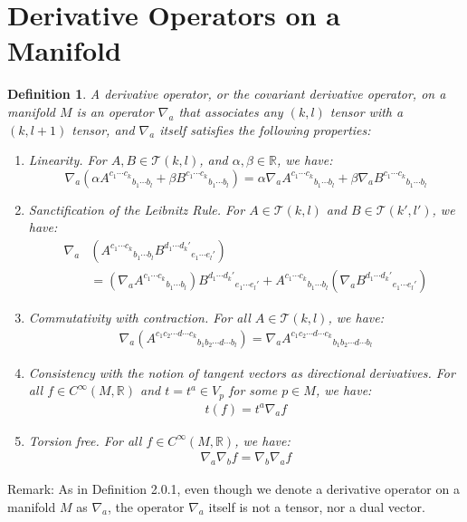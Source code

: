 \documentclass[11pt, onesided]{book}
\theoremstyle{break}
\theoremstyle{break}
\newtheorem{defn}{Definition}[thm]
\newcommand{\R}{\mathbb{R}}
\newcommand{\remark}{\color{blue}Remark: \color{black}}
\begin{document}
\section[Derivative Operators on a Manifold]{\color{red} Derivative Operators on a Manifold\color{black}}
\begin{defn}
A derivative operator, or the covariant derivative operator, on a manifold $M$ is an operator $\nabla_a$ that associates any $(k, l)$ tensor with a $(k, l+1)$ tensor, and $\nabla_a$ itself satisfies the following properties:
\begin{enumerate}
\item Linearity. For $A,B \in \mathcal{T}(k, l)$, and $\alpha,\beta \in \R$, we have: 
$$\nabla_a(\alpha A^{c_1 \cdots  c_k}{}_{b_1 \cdots b_l} + \beta B^{c_1\cdots  c_k}{}_{b_1 \cdots b_l}) = \alpha \nabla_a A^{c_1 \cdots  c_k}{}_{b_1 \cdots b_l} + \beta \nabla_a B^{c_1 \cdots  c_k}{}_{b_1 \cdots b_l}$$
\item Sanctification of the Leibnitz Rule. For $A\in \mathcal{T}(k, l)$ and $B\in \mathcal{T}(k',l')$, we have: 
\begin{align*}
\nabla_a&\left(A^{c_1 \cdots  c_k}{}_{b_1 \cdots b_l} B^{d_1 \cdots  d_k'}{}_{e_1 \cdots e_l'}  \right)\\
&=\left( \nabla_a  A^{c_1 \cdots  c_k}{}_{b_1 \cdots b_l} \right)B^{d_1 \cdots  d_k'}{}_{e_1 \cdots e_l'}  + A^{c_1 \cdots  c_k}{}_{b_1 \cdots b_l} \left( \nabla_a B^{d_1 \cdots  d_k'}{}_{e_1 \cdots e_l'} \right)
\end{align*}
\item Commutativity with contraction. For all $A \in \mathcal{T}(k,l)$, we have:
\begin{align*}
\nabla_a (A^{c_1  c_2 \cdots  d  \cdots  c_k}{}_{b_1 b_2 \cdots  d  \cdots  b_l}) = \nabla_a A^{c_1  c_2 \cdots  d  \cdots  c_k}{}_{b_1 b_2 \cdots  d  \cdots  b_l}
\end{align*}
\item Consistency with the notion of tangent vectors as directional derivatives. For all $f \in C^\infty(M, \R)$ and $t=t^a \in V_p$ for some $p \in M$, we have:
\begin{align*}
t(f) = t^a\nabla_a f
\end{align*}
\item Torsion free. For all $f \in C^\infty (M, \R)$, we have:
\begin{align*}
\nabla_a\nabla_b f = \nabla_b \nabla_a f
\end{align*}
\end{enumerate}
\end{defn}
\remark As in Definition 2.0.1, even though we denote a derivative operator on a manifold $M$ as $\nabla_a$, the operator $\nabla_a$ itself is not a tensor, nor a dual vector. \\
\end{document}
